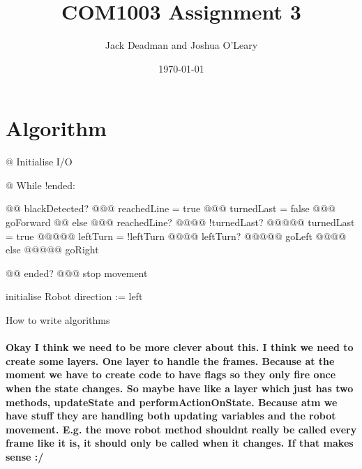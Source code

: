 \documentclass[a4paper]{report}
\title{COM1003 Assignment 3}
\author{Jack Deadman and Joshua O'Leary}
\date{\today}
\begin{document}
\maketitle

\section{Algorithm}
\begin{easylist}
@ Initialise I/O

@ While !ended:

@@ blackDetected?
@@@ reachedLine = true
@@@ turnedLast = false
@@@ goForward
@@ else
@@@ reachedLine?
@@@@ !turnedLast?
@@@@@ turnedLast = true
@@@@@ leftTurn = !leftTurn
@@@@ leftTurn?
@@@@@ goLeft
@@@@ else
@@@@@ goRight

@@ ended?
@@@ stop movement


\end{easylist}

\pagebreak

\begin{algorithm}[H]
 initialise Robot\;
 direction := left\;
 \caption{How to write algorithms}
\end{algorithm}

\paragraph{
Okay I think we need to be more clever about this. I think we need to create some layers. One layer to handle the frames. Because at the moment we have to create code to have flags so they only fire once when the state changes. So maybe have like a layer which just has two methods, updateState and performActionOnState. Because atm we have stuff they are handling both updating variables and the robot movement. E.g. the move robot method shouldnt really be called every frame like it is, it should only be called when it changes. If that makes sense :/
}
\end{document}
